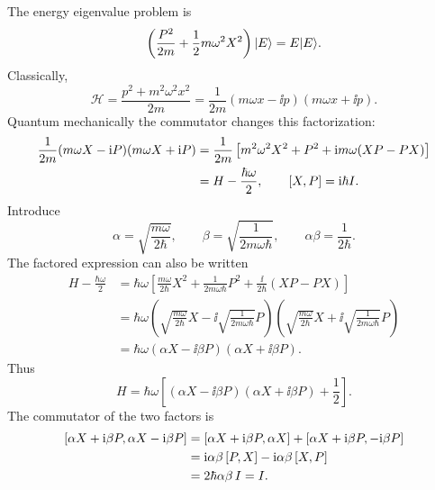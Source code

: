 The energy eigenvalue problem is
\[
 \left(\frac{P^2}{2m}+\frac12m\omega^2X^2\right)\lvert E\rangle=E\lvert E\rangle.
\]
Classically,
\[
 \mathcal H=\frac{p^2+m^2\omega^2x^2}{2m}
 =\frac1{2m}(m\omega x-\ii p)(m\omega x+\ii p).
\]
Quantum mechanically the commutator changes this factorization:
\begin{align*}
 \frac1{2m}(m\omega X-\mathrm{i} P)(m\omega X+\mathrm{i} P)
 &=\frac1{2m}\left[m^2\omega^2X^2+P^2
                  +\mathrm{i} m\omega(XP-PX)\right]\\
 &=H-\frac{\hbar\omega}{2},
 \qquad \left[X,P\right]=\mathrm{i}\hbar I.
\end{align*}
Introduce
\[
 \alpha=\sqrt{\frac{m\omega}{2\hbar}},\qquad
 \beta=\sqrt{\frac1{2m\omega\hbar}},\qquad
 \alpha\beta=\frac1{2\hbar}.
\]
The factored expression can also be written
\begin{align*}
 H-\frac{\hbar\omega}{2}
 &=\hbar\omega\left[\frac{m\omega}{2\hbar}X^2
       +\frac1{2m\omega\hbar}P^2+\frac{\ii}{2\hbar}(XP-PX)\right]\\
 &=\hbar\omega
 \left(\sqrt{\frac{m\omega}{2\hbar}}X
       -\ii\sqrt{\frac1{2m\omega\hbar}}P\right)
 \left(\sqrt{\frac{m\omega}{2\hbar}}X
       +\ii\sqrt{\frac1{2m\omega\hbar}}P\right)\\
 &=\hbar\omega(\alpha X-\ii\beta P)(\alpha X+\ii\beta P).
\end{align*}
Thus
\[
 \boxed{H=\hbar\omega\left[(\alpha X-\ii\beta P)
                  (\alpha X+\ii\beta P)+\frac12\right].}
\]
The commutator of the two factors is
\begin{align*}
 \left[\alpha X+\mathrm{i}\beta P,\alpha X-\mathrm{i}\beta P\right]
 &=\left[\alpha X+\mathrm{i}\beta P,\alpha X\right]
   +\left[\alpha X+\mathrm{i}\beta P,-\mathrm{i}\beta P\right]\\
 &=\mathrm{i}\alpha\beta\left[P,X\right]-\mathrm{i}\alpha\beta\left[X,P\right]\\
 &=2\hbar\alpha\beta\,I=I.
\end{align*}
